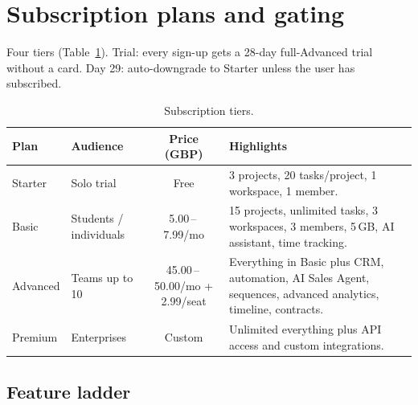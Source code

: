 \documentclass[11pt,a4paper,oneside]{article}
\newcommand{\dash}{\,--\,}
\begin{document}
\section{Subscription plans and gating}\label{sec:plans}

Four tiers (Table~\ref{tab:tiers}). Trial: every sign-up gets a
28-day full-Advanced trial without a card. Day 29: auto-downgrade
to Starter unless the user has subscribed.

\begin{table}[H]
\centering
\small
\begin{tabularx}{\textwidth}{@{}llcX@{}}
\toprule
\textbf{Plan}  & \textbf{Audience}        & \textbf{Price (GBP)}              & \textbf{Highlights} \\
\midrule
Starter  & Solo trial               & Free                             & 3 projects, 20 tasks/project, 1 workspace, 1 member. \\
Basic    & Students / individuals   & 5.00\dash 7.99/mo                & 15 projects, unlimited tasks, 3 workspaces, 3 members, 5\,GB, AI assistant, time tracking. \\
Advanced & Teams up to 10           & 45.00\dash 50.00/mo + 2.99/seat  & Everything in Basic plus CRM, automation, AI Sales Agent, sequences, advanced analytics, timeline, contracts. \\
Premium  & Enterprises              & Custom                            & Unlimited everything plus API access and custom integrations. \\
\bottomrule
\end{tabularx}
\caption{Subscription tiers.}
\label{tab:tiers}
\end{table}

\subsection{Feature ladder}
\end{document}
